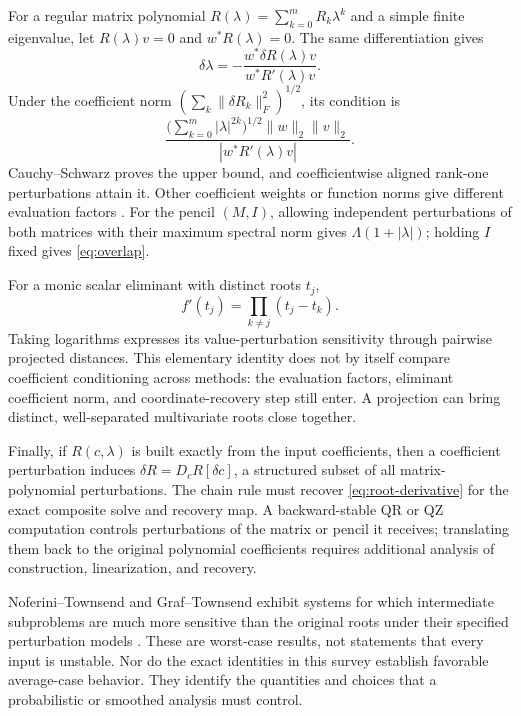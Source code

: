 \documentclass[12pt]{article}
\theoremstyle{definition}
\theoremstyle{remark}
\begin{document}
For a regular matrix polynomial $R(\lambda)=\sum_{k=0}^mR_k\lambda^k$ and a
simple finite eigenvalue, let $R(\lambda)v=0$ and $w^*R(\lambda)=0$.
The same differentiation gives
\[
  \delta\lambda=-\frac{w^*\delta R(\lambda)v}{w^*R'(\lambda)v}.
\]
Under the coefficient norm $(\sum_k\|\delta R_k\|_F^2)^{1/2}$, its condition is
\begin{equation}\label{eq:pep-condition}
  \frac{\bigl(\sum_{k=0}^m|\lambda|^{2k}\bigr)^{1/2}
  \|w\|_2\|v\|_2}{|w^*R'(\lambda)v|}.
\end{equation}
Cauchy--Schwarz proves the upper bound, and coefficientwise aligned rank-one
perturbations attain it. Other coefficient weights or function norms give different
evaluation factors \cite{tisseur2000backward}. For the pencil $(M,I)$, allowing
independent perturbations of both matrices with their maximum spectral norm gives
$\Lambda(1+|\lambda|)$; holding $I$ fixed gives \eqref{eq:overlap}.

For a monic scalar eliminant with distinct roots $t_j$,
\[
  f'(t_j)=\prod_{k\ne j}(t_j-t_k).
\]
Taking logarithms expresses its value-perturbation sensitivity through pairwise
projected distances. This elementary identity does not by itself compare coefficient
conditioning across methods: the evaluation factors, eliminant coefficient norm,
and coordinate-recovery step still enter. A projection can bring distinct,
well-separated multivariate roots close together.

Finally, if $R(c,\lambda)$ is built exactly from the input coefficients, then a
coefficient perturbation induces $\delta R=D_cR[\delta c]$, a structured subset
of all matrix-polynomial perturbations. The chain rule must recover
\eqref{eq:root-derivative} for the exact composite solve and recovery map.
A backward-stable QR or QZ computation controls perturbations of the matrix or
pencil it receives; translating them back to the original polynomial coefficients
requires additional analysis of construction, linearization, and recovery.

Noferini--Townsend and Graf--Townsend exhibit systems for which intermediate
subproblems are much more sensitive than the original roots under their specified
perturbation models \cite{noferini2016numerical,graf2026numerical}. These are
worst-case results, not statements that every input is unstable. Nor do the exact
identities in this survey establish favorable average-case behavior. They identify
the quantities and choices that a probabilistic or smoothed analysis must control.
\end{document}
